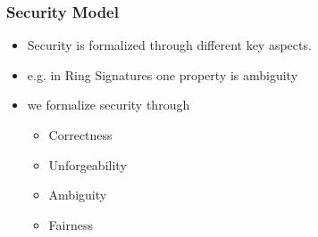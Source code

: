 \begin{frame}
	\frametitle{Security Model}

	\begin{itemize}
		\item Security is formalized through different key aspects.
		\item e.g. in Ring Signatures one property is ambiguity
		\item we formalize security through
			\begin{itemize}
				\item Correctness
				\item Unforgeability
				\item Ambiguity
				\item Fairness
			\end{itemize}
	\end{itemize}
\end{frame}